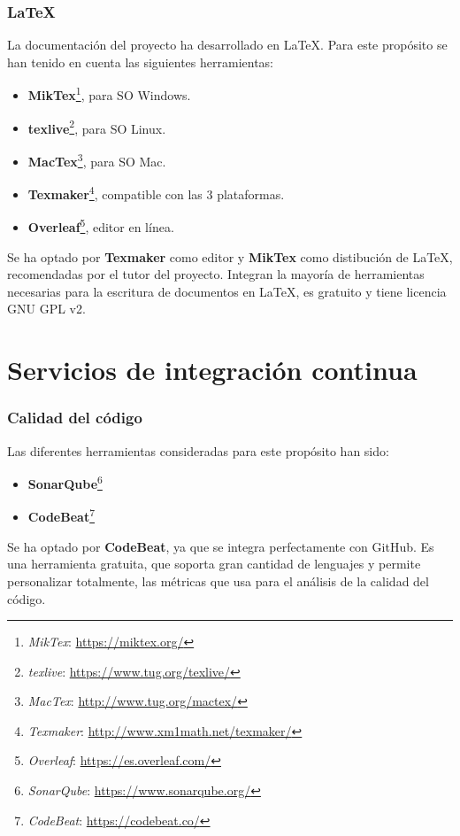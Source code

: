 \subsubsection{\LaTeX}
La documentación del proyecto ha desarrollado en \LaTeX. Para este propósito se han tenido en cuenta las siguientes herramientas:
\begin{itemize}
\item \textbf{MikTex}\footnote{\textsl{MikTex}: \url{https://miktex.org/}}, para SO Windows.
\item \textbf{texlive}\footnote{\textsl{texlive}: \url{https://www.tug.org/texlive/}}, para SO Linux.
\item \textbf{MacTex}\footnote{\textsl{MacTex}: \url{http://www.tug.org/mactex/}}, para SO Mac.
\item \textbf{Texmaker}\footnote{\textsl{Texmaker}: \url{http://www.xm1math.net/texmaker/}}, compatible con las 3 plataformas.
\item \textbf{Overleaf}\footnote{\textsl{Overleaf}: \url{ https://es.overleaf.com/}}, editor en línea.
\end{itemize}

Se ha optado por \textbf{Texmaker} como editor y \textbf{MikTex} como distibución de \LaTeX, recomendadas por el tutor del proyecto.
Integran la mayoría de herramientas necesarias para la escritura de documentos en \LaTeX, es gratuito y tiene licencia GNU GPL v2.

\section{Servicios de integración continua}


\subsubsection{Calidad del código}
Las diferentes herramientas consideradas para este propósito han sido: 
\begin{itemize}
\item \textbf{SonarQube}\footnote{\textsl{SonarQube}: \url{https://www.sonarqube.org/}}
\item \textbf{CodeBeat}\footnote{\textsl{CodeBeat}: \url{https://codebeat.co/}}
\end{itemize}

Se ha optado por \textbf{CodeBeat}, ya que se integra perfectamente con GitHub. Es una herramienta gratuita, que soporta gran cantidad de lenguajes y permite personalizar totalmente, las métricas que usa para el análisis de la calidad del código.

